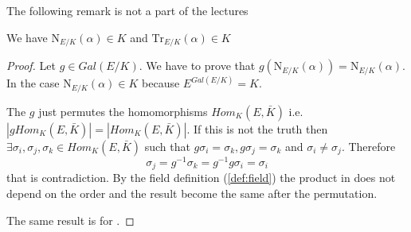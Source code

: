 The following remark is not a part of the lectures
\begin{remark}
  We have $\mathrm {N}_{E/K}\left(\alpha\right) \in K$ and
  $\mathrm {Tr}_{E/K}\left(\alpha\right) \in K$
  \begin{proof}
    Let $g \in Gal\left(E/K\right)$. We have to prove that
    $g\left(\mathrm {N}_{E/K}\left(\alpha\right)\right) =
    \mathrm {N}_{E/K}\left(\alpha\right)$. In the case
    $\mathrm {N}_{E/K}\left(\alpha\right) \in K$ because
    $E^{Gal\left(E/K\right)} = K$.

    The $g$ just permutes the homomorphisms $Hom_K\left(E,
    \bar{K}\right)$ i.e.
    $\left|g Hom_K\left(E, \bar{K}\right)\right| =
    \left|Hom_K\left(E, \bar{K}\right)\right|$. If this is not the
    truth then $\exists \sigma_i, \sigma_j, \sigma_k \in Hom_K\left(E,
    \bar{K}\right)$ such that
    $g\sigma_i = \sigma_k, g \sigma_j = \sigma_k$ and
    $\sigma_i \ne \sigma_j$.
    Therefore
    \[
    \sigma_j = g^{-1} \sigma_k = g^{-1} g \sigma_i = \sigma_i
    \]
    that is contradiction.
    By  the field definition
    (\ref{def:field}) the product in
     does not depend on the order and the
    result become the same after the permutation.

    The same result is for .
  \end{proof}
  \label{rem:lec9_add}
\end{remark}

